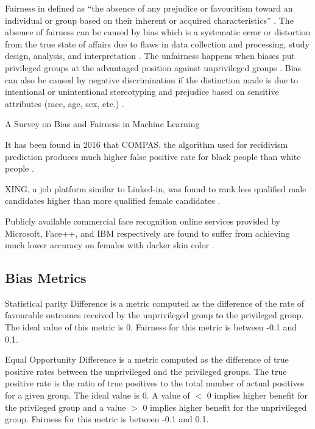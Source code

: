 \documentclass[sigconf,review]{acmart}
\begin{document}
Fairness in defined as ``the absence of any prejudice or favouritism toward an individual or
group based on their inherent or acquired characteristics'' \cite{mehrabi2021survey}.
The absence of fairness can be caused by bias which is a systematic error or distortion from the true state of affairs due to flaws in data collection and processing, study design, analysis, and interpretation \cite{oxford2022bias}. 
The unfairness happens when biases put privileged groups at the advantaged position against unprivileged groups \cite{bellamy2018ai}. 
Bias can also be caused by negative discrimination if the distinction made is due to intentional or unintentional stereotyping and prejudice based on sensitive attributes (race, age, sex, etc.) \cite{mehrabi2021survey,chen2019fairness}. 






A Survey on Bias and Fairness in Machine Learning

It has been found in 2016 that COMPAS, the algorithm used for recidivism prediction produces much higher false positive rate for black people than white people \cite{angwin2016machine}.

XING, a job platform similar to Linked-in, was found to rank less qualified male candidates higher than more qualified female candidates \cite{lahoti2019ifair}.

Publicly available commercial face recognition online services provided by Microsoft, Face++, and IBM respectively are found to suffer from achieving much lower accuracy on females with darker skin color \cite{buolamwini2018gender}.

\subsection{Bias Metrics}
\label{sec:bias_metrics}



Statistical parity Difference \cite{dwork2012fairness,bellamy2018ai} is a metric computed as the difference of the rate of favourable outcomes received by the unprivileged group to the privileged group. The ideal value of this metric is 0. Fairness for this metric is between -0.1 and 0.1.

Equal Opportunity Difference \cite{bellamy2018ai} is a metric computed as the difference of true positive rates between the unprivileged and the privileged groups. 
The true positive rate is the ratio of true positives to the total number of actual positives for a given group. The ideal value is 0. A value of $<$ 0 implies higher benefit for the privileged group and a value $>$ 0 implies higher benefit for the unprivileged group. Fairness for this metric is between -0.1 and 0.1.
\end{document}
